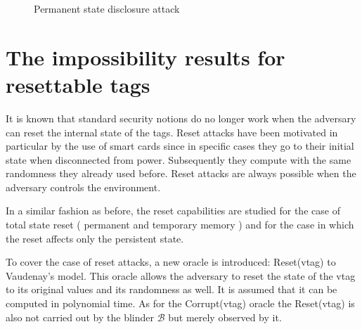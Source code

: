     \begin{figure}[H]
        
    \hspace*{2cm}
    \caption{Permanent state disclosure attack}
    \end{figure}

\section{The impossibility results for resettable tags}

    It is known that standard security notions do no longer work when the adversary can reset the internal state of the tags. Reset attacks have
    been motivated in particular by the use of smart cards since in specific cases they go to their initial state when disconnected from power. Subsequently
    they compute with the same randomness they already used before. Reset attacks are always possible when the adversary controls the environment.

    In a similar fashion as before, the reset capabilities are studied for the case of total state reset ( permanent and temporary memory ) and for the case in which
    the reset affects only the persistent state.

    To cover the case of reset attacks, a new oracle is introduced: Reset(vtag) to Vaudenay's model. This oracle allows the adversary to reset the state of the vtag
    to its original values and its randomness as well. It is assumed that it can be computed in polynomial time. As for the Corrupt(vtag) oracle the Reset(vtag) is also not carried out
    by the blinder $\mathcal{B}$ but merely observed by it.

